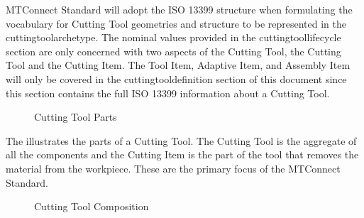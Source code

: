 MTConnect Standard will adopt the ISO 13399 structure when formulating the vocabulary for Cutting Tool geometries and structure to be represented in the \gls{cuttingtoolarchetype}.  The nominal values provided in the \gls{cuttingtoollifecycle} section are only concerned with two aspects of the Cutting Tool, the Cutting Tool and the Cutting Item.  The Tool Item, Adaptive Item, and Assembly Item will only be covered in the \gls{cuttingtooldefinition} section of this document since this section contains the full ISO 13399 information about a Cutting Tool.

\begin{figure}[ht]
  \centering
  \caption{Cutting Tool Parts}
  \label{fig:cutting-tool-parts}
\end{figure}

\FloatBarrier

The  illustrates the parts of a Cutting Tool.  The Cutting Tool is the aggregate of all the components and the Cutting Item is the part of the tool that removes the material from the workpiece.  These are the primary focus of the MTConnect Standard. 

\begin{figure}[ht]
  \centering
  \caption{Cutting Tool Composition}
  \label{fig:cutting-tool-composition}
\end{figure}


